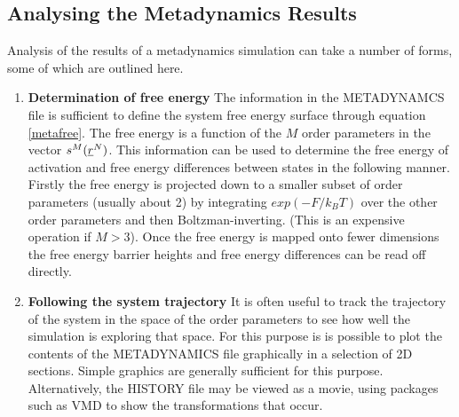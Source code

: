 \subsection{Analysing the Metadynamics Results}

Analysis of the results of a metadynamics simulation can take a number of
forms, some of which are outlined here.

\begin{enumerate}
\item {\bf Determination of free energy} \newline The information in the
  METADYNAMCS file is sufficient to define the system free energy surface
  through equation \ref{metafree}. The free energy is a function of the $M$
  order parameters in the vector $s^{M}(\mbox{$\underline{r}$}^{N})$. This information can be
  used to determine the free energy of activation and free energy differences
  between states in the following manner. Firstly the free energy is projected
  down to a smaller subset of order parameters (usually about 2) by
  integrating $exp(-F/k_{B}T)$ over the other order parameters
  and then Boltzman-inverting. (This is an expensive operation if $M>3$). 
  Once the free energy is mapped onto fewer dimensions the free energy 
  barrier heights and free energy differences can be read off directly.
\item {\bf Following the system trajectory} \newline It is often useful to
  track the trajectory of the system in the space of the order parameters to
  see how well the simulation is exploring that space. For this purpose is is
  possible to plot the contents of the METADYNAMICS file graphically in a
  selection of 2D sections. Simple graphics are generally sufficient for this
  purpose. Alternatively, the HISTORY file may be viewed as a movie, using
  packages such as VMD \cite{VMD} to show the transformations that occur.
\end{enumerate}

